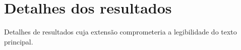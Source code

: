 \chapter{Detalhes dos resultados}
Detalhes de resultados cuja extensão comprometeria a legibilidade do texto principal.
